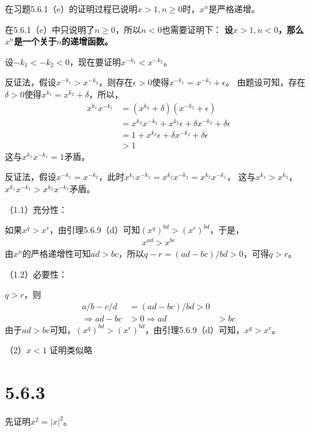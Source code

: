 \documentclass{article}
\theoremstyle{mystyle}
\begin{document}
在习题5.6.1（e）的证明过程已说明$x>1, n \geq 0$时，$x^n$是严格递增。
\begin{zgraytheorem}
  在5.6.1（e）中只说明了$n \geq 0$，所以$n < 0$也需要证明下：
  \textbf{设$x>1, n<0$，那么$x^n$是一个关于$n$的递增函数。}

  设$-k_1 < -k_2 < 0$，现在要证明$x^{-k_1} < x^{-k_2}$。

  反证法，假设$x^{-k_1} > x^{-k_2}$，则存在$\epsilon > 0$使得$x^{-k_1} = x^{-k_2} + \epsilon$。
  由题设可知，存在$ \delta > 0$使得$x^{k_1} = x^{k_2} + \delta$，所以，
  \begin{align*}
    x^{k_1}x^{-k_1} & = (x^{k_2} + \delta)(x^{-k_2} + \epsilon)                               \\
                    & = x^{k_2}x^{-k_2} + x^{k_2}\epsilon + \delta x^{-k_2} + \delta \epsilon \\
                    & = 1 + x^{k_2}\epsilon + \delta x^{-k_2} + \delta \epsilon               \\
                    & > 1
  \end{align*}
  这与$x^{k_1}x^{-k_1} = 1$矛盾。

  反证法，假设$x^{-k_1} = x^{-k_2}$，此时$x^{k_1}x^{-k_1} = x^{k_2}x^{-k_2} = x^{k_2}x^{-k_1}$，
  这与$x^{k_1} > x^{k_2}$，$x^{k_1}x^{-k_1} > x^{k_2}x^{-k_1}$矛盾。

\end{zgraytheorem}

（1.1）充分性：

如果$x^q > x^r$，由引理5.6.9（d）可知$(x^q)^{bd} > (x^r)^{bd}$，于是，
\begin{align*}
  x^{ad} >  x^{bc}
\end{align*}
由$x^n$的严格递增性可知$ad > bc$，所以$q - r = (ad-bc)/bd > 0$，可得$q > r$。


（1.2）必要性：

$q>r$，则
\begin{align*}
  a/b - c/d           & = (ad-bc)/bd > 0 \\
  \Rightarrow ad - bc & > 0
  \Rightarrow ad      & > bc
\end{align*}
由于$ad > bc$可知，$(x^q)^{bd} > (x^r)^{bd}$，由引理5.6.9（d）可知，$x^q > x^r$。

（2）$x < 1$
证明类似略

\section*{5.6.3}

先证明$x^2 = |x|^2$。
\end{document}
